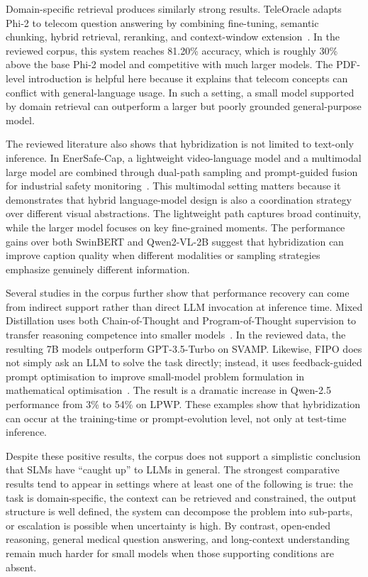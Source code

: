 Domain-specific retrieval produces similarly strong results. TeleOracle adapts Phi-2 to telecom question answering by combining fine-tuning, semantic chunking, hybrid retrieval, reranking, and context-window extension~\cite{alabbasi2024teleoracle}. In the reviewed corpus, this system reaches 81.20\% accuracy, which is roughly 30\% above the base Phi-2 model and competitive with much larger models. The PDF-level introduction is helpful here because it explains that telecom concepts can conflict with general-language usage. In such a setting, a small model supported by domain retrieval can outperform a larger but poorly grounded general-purpose model.

The reviewed literature also shows that hybridization is not limited to text-only inference. In EnerSafe-Cap, a lightweight video-language model and a multimodal large model are combined through dual-path sampling and prompt-guided fusion for industrial safety monitoring~\cite{cao2025enersafe}. This multimodal setting matters because it demonstrates that hybrid language-model design is also a coordination strategy over different visual abstractions. The lightweight path captures broad continuity, while the larger model focuses on key fine-grained moments. The performance gains over both SwinBERT and Qwen2-VL-2B suggest that hybridization can improve caption quality when different modalities or sampling strategies emphasize genuinely different information.

Several studies in the corpus further show that performance recovery can come from indirect support rather than direct LLM invocation at inference time. Mixed Distillation uses both Chain-of-Thought and Program-of-Thought supervision to transfer reasoning competence into smaller models~\cite{li2024mixed}. In the reviewed data, the resulting 7B models outperform GPT-3.5-Turbo on SVAMP. Likewise, FIPO does not simply ask an LLM to solve the task directly; instead, it uses feedback-guided prompt optimisation to improve small-model problem formulation in mathematical optimisation~\cite{amarasinghe2025fipo}. The result is a dramatic increase in Qwen-2.5 performance from 3\% to 54\% on LPWP. These examples show that hybridization can occur at the training-time or prompt-evolution level, not only at test-time inference.

Despite these positive results, the corpus does not support a simplistic conclusion that SLMs have ``caught up'' to LLMs in general. The strongest comparative results tend to appear in settings where at least one of the following is true: the task is domain-specific, the context can be retrieved and constrained, the output structure is well defined, the system can decompose the problem into sub-parts, or escalation is possible when uncertainty is high. By contrast, open-ended reasoning, general medical question answering, and long-context understanding remain much harder for small models when those supporting conditions are absent.

